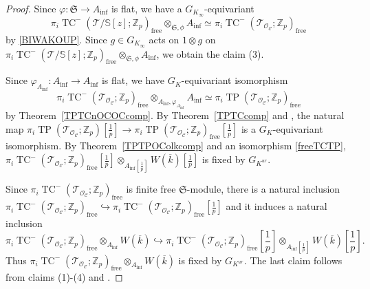 \documentclass[11pt]{amsart}
\newcommand{\Z}{\mathbb{Z}}
\newcommand{\sO}{\mathcal{O}}
\newcommand{\sT}{\mathcal{T}}
\newcommand{\bS}{\mathbb{S}}
\newcommand{\free}{\operatorname{{free}}}
\newcommand{\TP}{\operatorname{TP}}
\newcommand{\TCn}{\operatorname{TC}^{-}}
\newcommand{\ol}{\overline}
\newcommand{\Ainf}{A_{\operatorname{inf}}}
\newcommand{\Cu}{\mathcal{C}}
\newcommand{\mS}{\mathfrak{S}}
\theoremstyle{definition}
\theoremstyle{remark}
\numberwithin{equation}{section}
\begin{document}
\begin{proof}
 Since $\varphi:\mS\to\Ainf$ is flat, we have a $G_{K_\infty}$-equivariant
 \begin{equation}\label{kenka1} \pi_i\TCn(\sT/\bS[z];\Z_p)_{\free}\otimes_{\mS,\phi}\Ainf\simeq \pi_i\TCn(\sT_{\sO_\Cu};\Z_p)_{\free}  
 \end{equation}
 by \eqref{BIWAKOUP}. Since $g\in G_{K_\infty}$ acts on $1\otimes g$ on $\pi_i\TCn(\sT/\bS[z];\Z_p)_{\free}\otimes_{\mS,\phi}\Ainf$, we obtain the claim (3).
 
Since $\varphi_{\Ainf}:\Ainf \to \Ainf$ is flat, we have $G_K$-equivariant isomorphism
\begin{equation}\label{freeTCTP}
\pi_i\TCn(\sT_{\sO_\Cu};\Z_p)_{\free}\otimes_{\Ainf,\varphi_{\Ainf}} \Ainf \simeq \pi_i\TP(\sT_{\sO_\Cu};\Z_p)_{\free}
\end{equation}
by Theorem~\ref{TPTCnOCOCcomp}. By Theorem~\ref{TPTCcomp} and \cite[Proposition 4.13]{BMS1}, the natural map $\pi_i\TP(\sT_{\sO_\Cu};\Z_p)[\frac{1}{p}] \to \pi_i\TP(\sT_{\sO_\Cu};\Z_p)_{\free}[\frac{1}{p}]$ is a $G_K$-equivariant isomorphism. By Theorem~\ref{TPTPOColkcomp} and an isomorphism \eqref{freeTCTP}, $\pi_i\TCn(\sT_{\sO_\Cu};\Z_p)_{\free}[\frac{1}{p}] \otimes_{\Ainf[\frac{1}{p}]} W(\ol{k})[\frac{1}{p}]$ is fixed by $G_{K^{ur}}$.

Since $\pi_i\TCn(\sT_{\sO_\Cu};\Z_p)_{\free}$ is finite free $\mS$-module, there is a natural inclusion $\pi_i\TCn(\sT_{\sO_\Cu};\Z_p)_{\free} \hookrightarrow\pi_i\TCn(\sT_{\sO_\Cu};\Z_p)_{\free}[\frac{1}{p}]$ and it induces a natural inclusion
\[
\pi_i\TCn(\sT_{\sO_\Cu};\Z_p)_{\free} \otimes_{\Ainf} W(\ol{k}) \hookrightarrow \pi_i\TCn(\sT_{\sO_\Cu};\Z_p)_{\free}[\frac{1}{p}] \otimes_{\Ainf[\frac{1}{p}]} W(\ol{k})[\frac{1}{p}].
\]
Thus $\pi_i\TCn(\sT_{\sO_\Cu};\Z_p)_{\free} \otimes_{\Ainf} W(\ol{k})$ is fixed by $G_{K^{ur}}$. The last claim follows from claims (1)-(4) and \cite[Lemma 7.1.2]{Gao}.
\end{proof}
\end{document}
